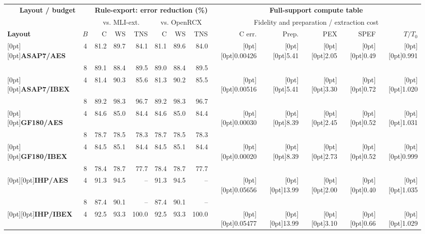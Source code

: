 \begingroup
\fontsize{5.8}{6.5}\selectfont
\setlength{\tabcolsep}{0.75pt}\setlength{\arrayrulewidth}{0.25pt}
\renewcommand{\arraystretch}{1.0}
\newcommand{\layoutspan}[1]{\raisebox{-3.25pt}[0pt][0pt]{#1}}
\begin{tabular*}{\columnwidth}{@{\extracolsep{\fill}}|l|c||rrr|rrr||rrrrr|}
\hline
\multicolumn{2}{|c||}{\textbf{Layout / budget}} & \multicolumn{6}{c||}{\textbf{Rule-export: error reduction (\%)}} & \multicolumn{5}{c|}{\textbf{Full-support compute table}} \\
\cline{3-13}
 & & \multicolumn{3}{c|}{vs. MLI-ext.} & \multicolumn{3}{c||}{vs. OpenRCX} & \multicolumn{5}{c|}{Fidelity and preparation / extraction cost} \\
\cline{3-13}
\textbf{Layout} & $B$ & C & WS & TNS & C & WS & TNS & C err. & Prep. & PEX & SPEF & $T/T_0$ \\
\hline
\layoutspan{\textbf{ASAP7/AES}} & 4 & 81.2 & 89.7 & 84.1 & 81.1 & 89.6 & 84.0 & \layoutspan{0.00426} & \layoutspan{5.41} & \layoutspan{2.05} & \layoutspan{0.49} & \layoutspan{0.991} \\
 & 8 & 89.1 & 88.4 & 89.5 & 89.0 & 88.4 & 89.5 &  &  &  &  &  \\
\hline
\layoutspan{\textbf{ASAP7/IBEX}} & 4 & 81.4 & 90.3 & 85.6 & 81.3 & 90.2 & 85.5 & \layoutspan{0.00516} & \layoutspan{5.41} & \layoutspan{3.30} & \layoutspan{0.72} & \layoutspan{1.020} \\
 & 8 & 89.2 & 98.3 & 96.7 & 89.2 & 98.3 & 96.7 &  &  &  &  &  \\
\hline
\layoutspan{\textbf{GF180/AES}} & 4 & 84.6 & 85.0 & 84.4 & 84.6 & 85.0 & 84.4 & \layoutspan{0.00030} & \layoutspan{8.39} & \layoutspan{2.45} & \layoutspan{0.52} & \layoutspan{1.031} \\
 & 8 & 78.7 & 78.5 & 78.3 & 78.7 & 78.5 & 78.3 &  &  &  &  &  \\
\hline
\layoutspan{\textbf{GF180/IBEX}} & 4 & 84.5 & 85.1 & 84.4 & 84.5 & 85.1 & 84.4 & \layoutspan{0.00020} & \layoutspan{8.39} & \layoutspan{2.73} & \layoutspan{0.52} & \layoutspan{0.999} \\
 & 8 & 78.4 & 78.7 & 77.7 & 78.4 & 78.7 & 77.7 &  &  &  &  &  \\
\hline
\layoutspan{\textbf{IHP/AES}} & 4 & 91.3 & 94.5 & -- & 91.3 & 94.5 & -- & \layoutspan{0.05656} & \layoutspan{13.99} & \layoutspan{2.00} & \layoutspan{0.40} & \layoutspan{1.035} \\
 & 8 & 87.4 & 90.1 & -- & 87.4 & 90.1 & -- &  &  &  &  &  \\
\hline
\layoutspan{\textbf{IHP/IBEX}} & 4 & 92.5 & 93.3 & 100.0 & 92.5 & 93.3 & 100.0 & \layoutspan{0.05477} & \layoutspan{13.99} & \layoutspan{3.10} & \layoutspan{0.66} & \layoutspan{1.029} \\

\end{tabular*}
